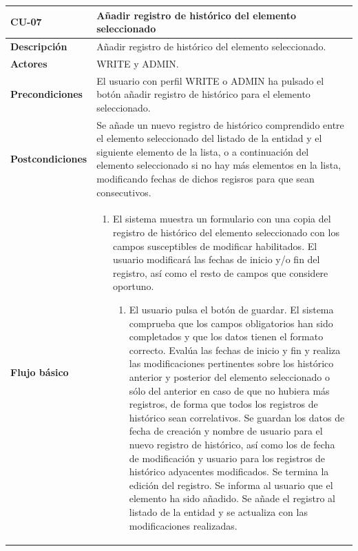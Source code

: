\begin{table} [H]
    \centering
    \setlength{\leftmargini}{0.4cm}
	\resizebox{15cm}{!} { %
    \begin{tabular}{| m{3cm} | m{12cm} |}   
    \hline
	  \textbf{CU-07} & \textbf{Añadir registro de histórico del elemento seleccionado} \\\hline
	  \textbf{Descripción} & Añadir registro de histórico del elemento seleccionado. \\\hline
	  \textbf{Actores} & WRITE y ADMIN. \\\hline
	  \textbf{Precondiciones} & El usuario con perfil WRITE o ADMIN ha pulsado el botón añadir registro de histórico para el elemento seleccionado. \\\hline
	  \textbf{Postcondiciones} & Se añade un nuevo registro de histórico  comprendido entre el elemento seleccionado del listado de la entidad y el siguiente elemento de la lista, o a continuación del elemento seleccionado si no hay más elementos en la lista, modificando fechas de dichos regisros para que sean consecutivos. \\\hline
	  \textbf{Flujo básico} & 
		\begin{enumerate}
	  	\item El sistema muestra un formulario con una copia del registro de histórico del elemento seleccionado con los campos susceptibles de modificar habilitados. El usuario modificará las fechas de inicio y/o fin del registro, así como el resto de campos que considere oportuno. 
			\begin{enumerate}	
			   \item El usuario pulsa el botón de guardar. El sistema comprueba que los campos obligatorios han sido completados y que los datos tienen el formato correcto. Evalúa las fechas de inicio y fin y realiza las modificaciones pertinentes sobre los histórico anterior y posterior del elemento seleccionado o sólo del anterior en caso de que no hubiera más registros, de forma que todos los registros de histórico sean correlativos. Se guardan los datos de fecha de creación y nombre de usuario para el nuevo registro de histórico, así como los de fecha de modificación y usuario para los registros de histórico adyacentes modificados. Se termina la edición del registro. Se informa al usuario que el elemento ha sido añadido. Se añade el registro al listado de la entidad y se actualiza con las modificaciones realizadas.

\end{enumerate}
\end{enumerate}
\end{tabular}}
\end{table}
